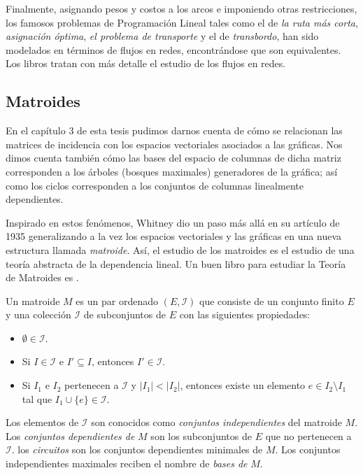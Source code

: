 Finalmente, asignando pesos y costos a los arcos e imponiendo otras restricciones, los famosos problemas de Programación Lineal tales como el de \textit{la ruta más corta}, \textit{asignación óptima}, \textit{el problema de transporte} y el de \textit{transbordo}, han sido modelados en términos de flujos en redes, encontrándose que son equivalentes. Los libros \cite{FordFulkerosns, Chen, Chen2, Bondy, Korte} tratan con más detalle el estudio de los flujos en redes.

\subsection{Matroides}
En el capítulo 3 de esta tesis pudimos darnos cuenta de cómo se relacionan las matrices de incidencia con los espacios vectoriales asociados a las gráficas. Nos dimos cuenta también cómo las bases del espacio de columnas de dicha matriz corresponden a los árboles (bosques maximales) generadores de la gráfica; así como los ciclos corresponden a los conjuntos de columnas linealmente dependientes.

Inspirado en estos fenómenos, Whitney dio un paso más allá en su artículo \cite{Whitney1935} de 1935 generalizando a la vez los espacios vectoriales y las gráficas en una nueva estructura llamada \textit{matroide}. Así, el estudio de los matroides es el estudio de una teoría abstracta de la dependencia lineal. Un buen libro para estudiar la Teoría de Matroides es \cite{Oxley}.

Un matroide $M$ es un par ordenado $(E,\mathcal{I})$ que consiste de un conjunto finito $E$ y una colección $\mathcal{I}$ de subconjuntos de $E$ con las siguientes propiedades:

\begin{itemize}
    \item $\emptyset \in \mathcal{I}$.
    \item Si $I\in \mathcal{I}$ e $I' \subseteq I$, entonces $I'\in \mathcal{I}$.
    \item Si $I_{1}$ e $I_{2}$ pertenecen a $\mathcal{I}$ y $|I_{1}|<|I_{2}|$, entonces existe un elemento $e \in I_{2} \setminus I_{1}$ tal que $I_{1} \cup \{e\} \in \mathcal{I}.$
\end{itemize}

Los elementos de $\mathcal{I}$ son conocidos como \textit{conjuntos independientes} del matroide $M$. Los \textit{conjuntos dependientes de} $M$ son los subconjuntos de $E$ que no pertenecen a $\mathcal{I}$. los \textit{circuitos} son los conjuntos dependientes minimales de $M$. Los conjuntos independientes maximales reciben el nombre de \textit{bases de} $M$. 

